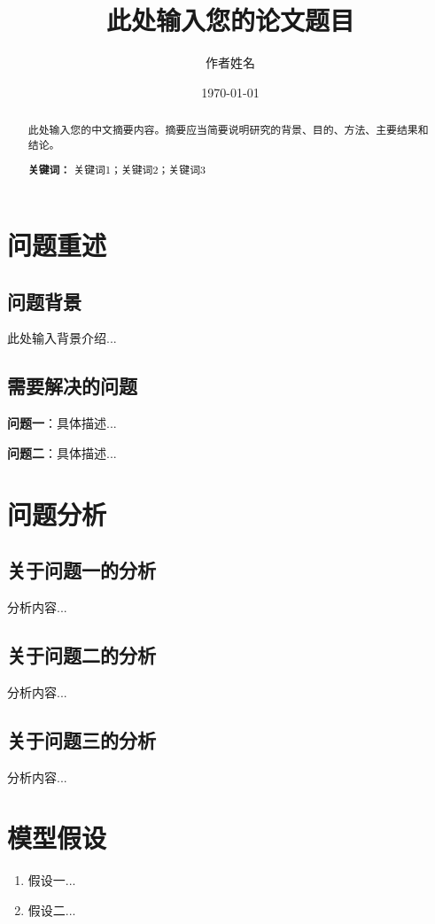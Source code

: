 \documentclass[UTF8, a4paper, 12pt]{ctexart}
\title{\textbf{此处输入您的论文题目}}
\author{作者姓名}
\date{\today}
\begin{document}
\maketitle

\begin{abstract}
此处输入您的中文摘要内容。摘要应当简要说明研究的背景、目的、方法、主要结果和结论。

\vspace{1em}
\noindent\textbf{关键词：} 关键词1；关键词2；关键词3
\end{abstract}

\newpage
\tableofcontents
\newpage

\section{问题重述}
\subsection{问题背景}
此处输入背景介绍...

\subsection{需要解决的问题}
\noindent\textbf{问题一}：具体描述...

\noindent\textbf{问题二}：具体描述...

\section{问题分析}
\subsection{关于问题一的分析}
分析内容...

\subsection{关于问题二的分析}
分析内容...

\subsection{关于问题三的分析}
分析内容...

\section{模型假设}
\begin{enumerate}
    \item 假设一...
    \item 假设二...
\end{enumerate}
\end{document}
